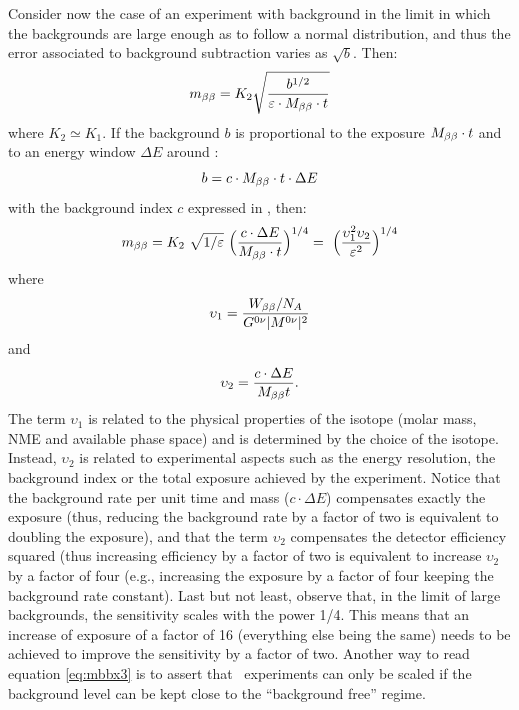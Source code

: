 Consider now the case of an experiment with background in the limit in which the backgrounds are large enough as to follow a normal distribution, and thus the error associated to background subtraction varies as $\sqrt{b}$. Then:
%
\begin{equation}
m_{\beta\beta} =K_{2} \sqrt{\frac{b^{1/2}}{\varepsilon\cdot M_{\beta\beta} \cdot t}} 
\label{eq:mbbx1}
\end{equation}
%
where $K_{2}\simeq K_1$. If the background $b$ is proportional to the exposure $M_{\beta\beta} \cdot t$ and to an energy window $\Delta E$ around \Qbb :
\begin{equation}
b = c\cdot M_{\beta\beta} \cdot t\cdot \Delta E
\label{eq:mbbx2}
\end{equation}
%
with the background index $c$ expressed in \ckkbby, then:
%
\begin{equation}
m_{\beta\beta} = K_2  \ \sqrt{1/\varepsilon} \ \Big(\frac{c\cdot \Delta E}{M_{\beta\beta} \cdot t}\Big)^{1/4} 
=\ \Big(\frac{\upsilon_1^2 \upsilon_2}{\varepsilon^2}\Big)^{1/4}
\label{eq:mbbx3}
\end{equation}
%
where 
$$\upsilon_1 = \frac{W_{\beta\beta}/N_A}{G^{0\nu}\lvert M^{0\nu}\rvert^2}$$ 
and 
$$\upsilon_2 = \frac{c\cdot \Delta E}{M_{\beta\beta} t}.$$ 
%
%
The term $\upsilon_1$ is related to the physical properties of the isotope (molar mass, NME and available phase space) and is determined by the choice of the isotope. Instead, $\upsilon_2$ is related to experimental aspects such as the energy resolution, the background index or the total exposure achieved by the experiment. Notice that the background rate per unit time and mass 
($c\cdot \Delta E$) compensates exactly the exposure (thus, reducing the background rate by a factor of two is equivalent to doubling the exposure), and that the term $\upsilon_2$
compensates the detector efficiency squared (thus increasing efficiency by a factor of two is equivalent to increase $\upsilon_2$ by a factor of four (e.g., increasing the exposure by a factor of four keeping the background rate constant). Last but not least, observe that, in the limit of large backgrounds, the sensitivity scales with the power 1/4. This means that an increase of exposure of a factor of 16 (everything else being the same) needs to be achieved to improve the \mbb sensitivity by a factor of two. Another way to read equation \ref{eq:mbbx3} is to assert that \bbonu\ experiments can only be scaled if the background level can be kept close to the ``background free'' regime. 

